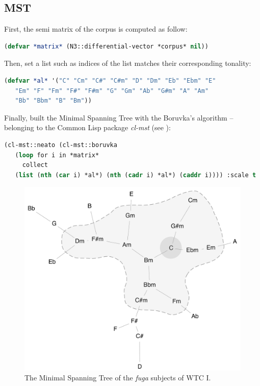 \subsection{MST}

First, the semi matrix of the corpus is computed as follow:
\begin{lstlisting}[language=Lisp]
(defvar *matrix* (N3::differential-vector *corpus* nil))
\end{lstlisting}

Then, set a list such as indices of the list matches their corresponding tonality:
\begin{lstlisting}[language=Lisp]
(defvar *al* '("C" "Cm" "C#" "C#m" "D" "Dm" "Eb" "Ebm" "E" 
   "Em" "F" "Fm" "F#" "F#m" "G" "Gm" "Ab" "G#m" "A" "Am" 
   "Bb" "Bbm" "B" "Bm"))
\end{lstlisting}

Finally, built the Minimal Spanning Tree with the Boruvka's algorithm -- belonging to the Common Lisp package \textsl{cl-mst} (see ): 

\begin{lstlisting}[language=Lisp]
(cl-mst::neato (cl-mst::boruvka 
   (loop for i in *matrix* 
     collect 
   (list (nth (car i) *al*) (nth (cadr i) *al*) (caddr i)))) :scale t :len t)
\end{lstlisting}

\begin{figure}[!hbt]
	\begin{center}
		\includegraphics[scale=0.55]{img/8801}
		\caption{The Minimal Spanning Tree of the \textit{fuga} subjects of WTC I.}
		\label{fig:mstcor}
	\end{center}
\end{figure}

